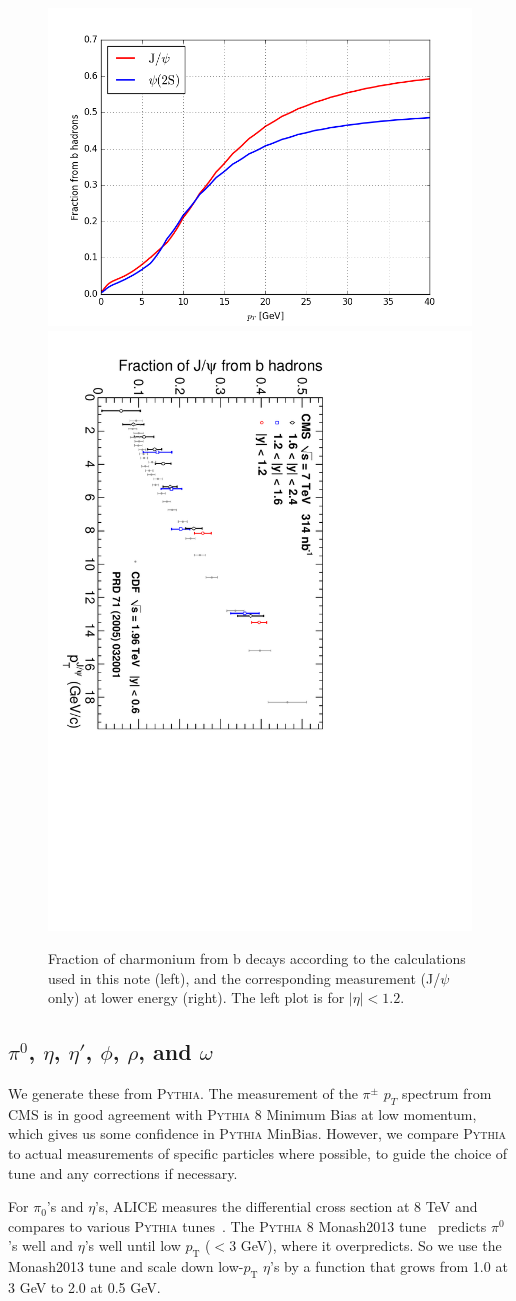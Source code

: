 \documentclass[12pt]{article}
\newcommand{\pythia}{\textsc{Pythia}\xspace}
\begin{document}
\begin{figure}
\includegraphics[width=0.53\linewidth]{plots/fraction-from-b-theory.png}
\includegraphics[height=0.46\linewidth, angle=90]{plots/bFraction-CMS-314nb-CDF.pdf}
\caption{Fraction of charmonium from b decays according to the calculations used in
  this note (left), and the corresponding measurement (J/$\psi$ only) at lower energy (right).
 The left plot is for $|\eta|<1.2$.}
  \label{fig:sanity}
\end{figure}



\subsection{$\pi^0$, $\eta$, $\eta'$, $\phi$, $\rho$, and $\omega$}
\label{sec:mesons}

We generate these from \pythia.  The measurement of the 
$\pi^{\pm}$
$p_T$ spectrum from CMS\cite{Sirunyan:2017zmn} is in good agreement
with \pythia 8 Minimum Bias at low momentum, which gives us some
confidence in \pythia MinBias. However, we compare \pythia to actual
measurements of specific particles where possible, to guide the choice
of tune and any corrections if necessary.

For $\pi_0$'s and $\eta$'s, ALICE measures the differential cross section 
at 8 TeV and compares to various \pythia tunes~\cite{ALICE:eta}.
The \pythia 8 Monash2013 tune~\cite{Monash} predicts $\pi^0$'s well and
$\eta$'s well until low $p_\mathrm{T}$ ($<$3 GeV), where it overpredicts.
So we use the Monash2013 tune and scale down low-$p_\mathrm{T}$ $\eta$'s
by a function that grows from 1.0 at 3 GeV to 2.0 at 0.5 GeV.
\end{document}
